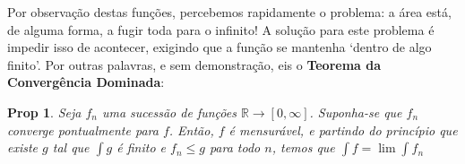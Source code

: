 \documentclass{article}
\newtheorem{prop}{Prop}
\newcommand{\R}{\mathbb{R}}
\begin{document}
Por observação destas funções, percebemos rapidamente o problema: a área está, de alguma forma, a fugir toda para o infinito! A solução para este problema é impedir isso de acontecer, exigindo que a função se mantenha `dentro de algo finito'. Por outras palavras, e sem demonstração, eis o \textbf{Teorema da Convergência Dominada}:

\begin{prop}
Seja $f_n$ uma sucessão de funções $\R \to [0, \infty]$. Suponha-se que $f_n$ converge pontualmente para $f$. Então, $f$ é mensurável, e partindo do princípio que existe $g$ tal que $\int g$ é finito e $f_n \leq g$ para todo $n$, temos que $\int f = \lim \int f_n$
\end{prop}
\end{document}
